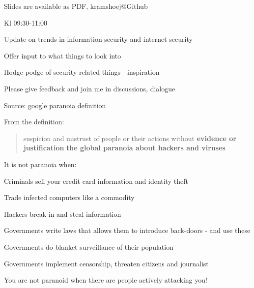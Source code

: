 \documentclass[20pt,landscape,a4paper,footrule]{foils}
\begin{document}


\vskip 2cm
\centerline{\footnotesize Slides are available as PDF, kramshoej@Github}


\begin{list1}
\item Kl 09:30-11:00
\item Update on trends in information security and internet security
\item Offer input to what things to look into
\vskip 2cm
\item Hodge-podge of security related things - inspiration 
\item Please give feedback and join me in discussions, dialogue \smiley
\end{list1}



Source: google paranoia definition


From the definition:
\begin{quote}
suspicion and mistrust of people or their actions without {\bf evidence or justification}
{\bf the global paranoia about hackers and viruses}
\end{quote}

\begin{list1}
\item It is not paranoia when:
\begin{list2}
\item Criminals sell your credit card information and identity theft
\item Trade infected computers like a commodity
\item Hackers break in and steal information
\item Governments write laws that allows them to introduce back-doors - and use these
\item Governments do blanket surveillance of their population
\item Governments implement censorship, threaten citizens and journalist
\end{list2}
\end{list1}

\vskip 1cm
\centerline{You are not paranoid when there are people actively attacking you!}
\end{document}
